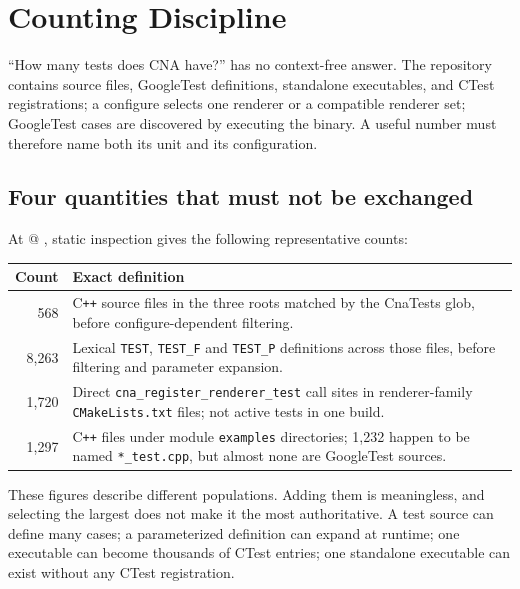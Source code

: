 \chapter{Counting Discipline}
\label{ch:counting-discipline}

``How many tests does CNA have?'' has no context-free answer.  The repository contains source
files, GoogleTest definitions, standalone executables, and CTest registrations; a configure
selects one renderer or a compatible renderer set; GoogleTest cases are discovered by executing
the binary.  A useful
number must therefore name both its unit and its configuration.

\section{Four quantities that must not be exchanged}

At \CnaEditionTag{} @ \CnaRevisionShort{}, static inspection gives the following representative
counts:

\begin{center}
\small
\begin{tabular}{rp{9.1cm}}
\toprule
Count & Exact definition \\
\midrule
568 & C\texttt{++} source files in the three roots matched by the CnaTests glob, before
      configure-dependent filtering. \\
8,263 & Lexical \texttt{TEST}, \texttt{TEST\_F} and \texttt{TEST\_P} definitions across those
        files, before filtering and parameter expansion. \\
1,720 & Direct \texttt{cna\_register\_renderer\_test} call sites in renderer-family
        \texttt{CMakeLists.txt} files; not active tests in one build. \\
1,297 & C\texttt{++} files under module \texttt{examples} directories; 1,232 happen to be named
        \texttt{*\_test.cpp}, but almost none are GoogleTest sources. \\
\bottomrule
\end{tabular}
\end{center}

These figures describe different populations.  Adding them is meaningless, and selecting the
largest does not make it the most authoritative.  A test source can define many cases; a
parameterized definition can expand at runtime; one executable can become thousands of CTest
entries; one standalone executable can exist without any CTest registration.

